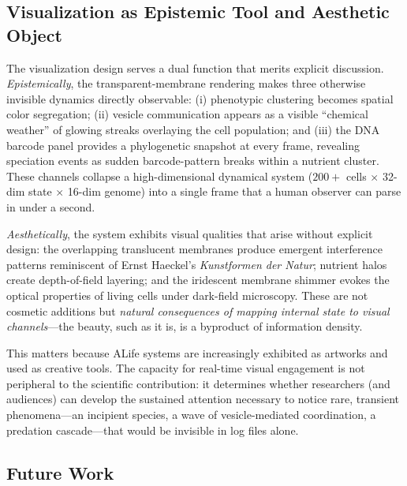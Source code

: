 \documentclass[10pt,twocolumn]{article}
\begin{document}
\subsection{Visualization as Epistemic Tool and Aesthetic Object}

The visualization design serves a dual function that merits explicit discussion.
\emph{Epistemically}, the transparent-membrane rendering makes three otherwise invisible dynamics directly observable: (i) phenotypic clustering becomes spatial color segregation; (ii) vesicle communication appears as a visible ``chemical weather'' of glowing streaks overlaying the cell population; and (iii) the DNA barcode panel provides a phylogenetic snapshot at every frame, revealing speciation events as sudden barcode-pattern breaks within a nutrient cluster.
These channels collapse a high-dimensional dynamical system ($200+$ cells $\times$ 32-dim state $\times$ 16-dim genome) into a single frame that a human observer can parse in under a second.

\emph{Aesthetically}, the system exhibits visual qualities that arise without explicit design: the overlapping translucent membranes produce emergent interference patterns reminiscent of Ernst Haeckel's \emph{Kunstformen der Natur}; nutrient halos create depth-of-field layering; and the iridescent membrane shimmer evokes the optical properties of living cells under dark-field microscopy.
These are not cosmetic additions but \emph{natural consequences of mapping internal state to visual channels}---the beauty, such as it is, is a byproduct of information density.

This matters because ALife systems are increasingly exhibited as artworks \cite{sims1994evolving} and used as creative tools.
The capacity for real-time visual engagement is not peripheral to the scientific contribution: it determines whether researchers (and audiences) can develop the sustained attention necessary to notice rare, transient phenomena---an incipient species, a wave of vesicle-mediated coordination, a predation cascade---that would be invisible in log files alone.

\subsection{Future Work}
\end{document}
